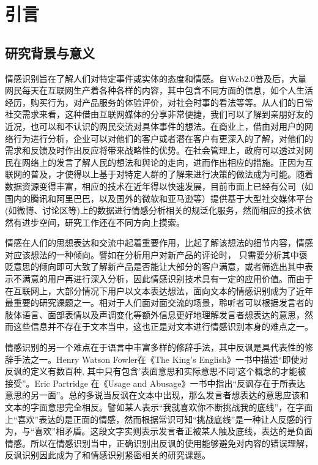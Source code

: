 \chapter{引言}
\label{cha:intro}

\section{研究背景与意义}

情感识别旨在了解人们对特定事件或实体的态度和情感。自Web2.0普及后，大量网民每天在互联网生产着各种各样的内容，其中包含不同方面的信息，如个人生活经历，购买行为，对产品服务的体验评价，对社会时事的看法等等。从人们的日常社交需求来看，这种借由互联网媒体的分享非常便捷，我们可以了解到亲朋好友的近况，也可以和不认识的网民交流对具体事件的想法。在商业上，借由对用户的网络行为进行分析，企业可以对他们的客户或者潜在客户有更深入的了解，对他们的需求和反馈及时作出反应将带来战略性的优势。在社会管理上，政府可以透过对网民在网络上的发言了解人民的想法和舆论的走向，进而作出相应的措施。正因为互联网的普及，才使得以上基于对特定人群的了解来进行决策的做法成为可能。随着数据资源变得丰富，相应的技术在近年得以快速发展，目前市面上已经有公司（如国内的腾讯和阿里巴巴，以及国外的微软和亚马逊等）提供基于大型社交媒体平台(如微博、讨论区等)上的数据进行情感分析相关的规泛化服务，然而相应的技术依然有进步空间，研究工作还在不同方向上摸索。

情感在人们的思想表达和交流中起着重要作用\cite{Banerjee2015Detection}，比起了解该想法的细节内容，情感对应该想法的一种倾向。譬如在分析用户对新产品的评论时，
只需要分析其中褒贬意思的倾向即可大致了解新产品是否能让大部分的客户满意，或者筛选出其中表示不满意的用户再进行深入分析，因此情感识别技术具有一定的应用价值。而由于在互联网上，大部分情况下用户以文本表达想法，面向文本的情感识别成为了近年最重要的研究课题之一。相对于人们面对面交流的场景，聆听者可以根据发言者的肢体语言、面部表情以及声调变化等额外信息更好地理解发言者想表达的意思，然而这些信息并不存在于文本当中，这也正是对文本进行情感识别本身的难点之一\cite{SemEval2019Task3}。

情感识别的另一个难点在于语言中丰富多样的修辞手法，其中反讽是具代表性的修辞手法之一。Henry Watson Fowler在《The King's English》一书中描述“即使对反讽的定义有数百种, 其中只有包含'表面意思和实际意思不同'这个概念的才能被接受”。Eric Partridge 在《Usage and Abusage》一书中指出“反讽存在于所表达意思的另一面”。总的多说当反讽在文本中出现，那么发言者想表达的意思应该和文本的字面意思完全相反。譬如某人表示“我就喜欢你不断挑战我的底线”，在字面上“喜欢”表达的是正面的情感，然而根据常识可知“挑战底线”是一种让人反感的行为，与“喜欢”相矛盾。这段文字实则表示发言者正被某人触及底线，表达的是负面情感。所以在情感识别当中，正确识别出反讽的使用能够避免对内容的错误理解，反讽识别因此成为了和情感识别紧密相关的研究课题。

